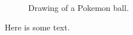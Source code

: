 \documentclass[
	paper=a4,
  paper    = a4,
  BCOR     = 10mm,
  DIV      = 14,
  twoside,
  fontsize = 11pt,
]{scrbook}
\begin{document}

\begin{figure}[tb]
	\centering
	
	\caption{Drawing of a Pokemon ball.}
\end{figure}

Here is some text.
\end{document}
